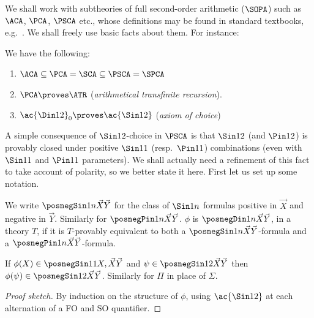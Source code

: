 % 
We shall work with subtheories of full second-order arithmetic ($\SOPA$) such as $ \ACA $, $  \PCA$, $  \PSCA$ etc., whose definitions may be found in standard textbooks, e.g.\ \cite{Simpson99:monograph}.
We shall freely use basic facts about them.
For instance:

\begin{proposition}
    \label{prop:basic-rev-math}
    We have the following:
    \begin{enumerate}
        \item\label{item:inclusions-basic-rev-math} $ \ACA \subseteq \PCA = \SCA \subseteq \PSCA = \SPCA $
        \item\label{item:pca-proves-atr-basic-rev-math} $\PCA \proves \ATR$ (\emph{arithmetical transfinite recursion}).
        \item\label{item:psca-proves-spac-basic-rev-math} $\ac{\Din 1 2}_0 \proves \ac{\Sin 1 2}$  (\emph{axiom of choice})
    \end{enumerate}
\end{proposition}


A simple consequence of $\Sin 1 2$-choice in $\PSCA$ is that $\Sin 1 2$ (and $\Pin 1 2 $) is provably closed under positive $\Sin 1 1 $ (resp.\ $\Pin 1 1 $) combinations (even with $\Sin 1 1 $ and $\Pin 1 1 $ parameters).
We shall actually need a refinement of this fact to take account of polarity, so we better state it here.
First let us set up some notation.


\begin{definition}
    We write $\posnegSin 1 n {\vec X}{\vec Y}$ for the class of $\Sin 1 n $ formulas positive in $\vec X$ and negative in $\vec Y$.
Similarly for $\posnegPin 1 n {\vec X}{\vec Y}$.
$\phi$ is $\posnegDin 1 n {\vec X}{\vec Y}$, in a theory $T$, if it is $T$-provably equivalent to both a $\posnegSin 1 n {\vec X}{\vec Y} $-formula and a $\posnegPin 1 n{\vec X}{\vec Y}$-formula.
\end{definition}

\begin{lemma}
\label{lem:pol-sub}
If $\phi(X) \in \posnegSin 1 1 {X,\vec X}{\vec Y}$ and $\psi\in \posnegSin 1 2 {\vec X}{\vec Y}$ then $\phi(\psi) \in \posnegSin 1 2 {\vec X}{\vec Y}$.
Similarly for $\Pi$ in place of $\Sigma$.
\end{lemma}
\begin{proof}
    [Proof sketch]
    By induction on the structure of $\phi$, using $\ac{\Sin 1 2}$ at each alternation of a FO and SO quantifier.
\end{proof}


